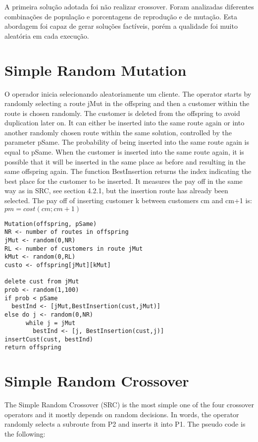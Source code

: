 \documentclass[conference]{IEEEtran}
\begin{document}

A primeira solução adotada foi não realizar crossover. Foram analizadas diferentes combinações de população e porcentagens de reprodução e de mutação. Esta abordagem foi capaz de gerar soluções factíveis, porém a qualidade foi muito aleatória em cada execução.

\section{Simple Random Mutation}
O operador inicia selecionando aleatoriamente um cliente.
The operator starts by randomly selecting a route jMut in the offspring and then a customer within the route is chosen randomly. The customer is deleted from the offspring to avoid duplication later on. It can either be inserted into the same route again or into another randomly chosen route within the same solution, controlled by the parameter pSame. The probability of being inserted into the same route again is equal to pSame. When the customer is inserted into the same route again, it is possible that it will be inserted in the same place as before and resulting in the same offspring again. The function BestInsertion returns the index indicating the best place for the customer to be inserted. It measures the pay off in the same way as in SRC, see section 4.2.1, but the insertion route has already been selected. The pay off of inserting customer k between customers cm and cm+1 is: $pm = cost(cm; cm+1)$

\begin{verbatim}
Mutation(offspring, pSame)
NR <- number of routes in offspring
jMut <- random(0,NR)
RL <- number of customers in route jMut
kMut <- random(0,RL)
custo <- offspring[jMut][kMut]

delete cust from jMut
prob <- random(1,100)
if prob < pSame
  bestInd <- [jMut,BestInsertion(cust,jMut)]
else do j <- random(0,NR)
      while j = jMut
        bestInd <- [j, BestInsertion(cust,j)]
insertCust(cust, bestInd)
return offspring
\end{verbatim}

\section{Simple Random Crossover}
The Simple Random Crossover (SRC) is the most simple one of the four crossover operators and it mostly depends on random decisions. In words, the operator randomly selects a subroute from P2 and inserts it into P1. The pseudo code is the following:
\end{document}
